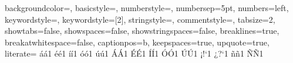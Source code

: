 


 {%
  backgroundcolor=\color{codeBakground},
  basicstyle={\ttfamily\footnotesize},
  numberstyle=\tiny\color{codeNumbers},
  numbersep=5pt,
  numbers=left,
  keywordstyle=\color{codeKeyword},
  keywordstyle={[2]\color{codeKeyword2}}, %
  stringstyle=\color{codeString},
  commentstyle=\color{codeComment},
  tabsize=2,
  showtabs=false,
  showspaces=false,
  showstringspaces=false,
  breaklines=true,
  breakatwhitespace=false,
  captionpos=b,
  keepspaces=true,
  upquote=true,                      %
  literate=%
  {á}{{\'a}}1 {é}{{\'e}}1 {í}{{\'i}}1 {ó}{{\'o}}1 {ú}{{\'u}}1
  {Á}{{\'A}}1 {É}{{\'E}}1 {Í}{{\'I}}1 {Ó}{{\'O}}1 {Ú}{{\'U}}1
  {¡}{{!`}}1  {¿}{{?`}}1
  {ñ}{{\~n}}1 {Ñ}{{\~N}}1
}

\lstset{style=mystyle}

